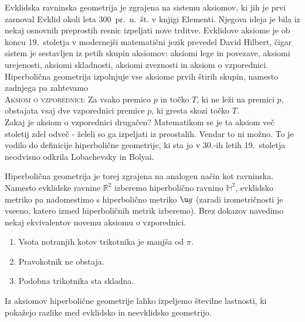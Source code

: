 \documentclass[a4paper]{article}
\begin{document}
Evklidska ravninska geometrija je zgrajena na sistemu aksiomov, ki jih je prvi zasnoval Evklid okoli leta 300~pr.~n.~št. v knjigi Elementi. Njegova ideja je bila iz nekaj osnovnih preprostih resnic izpeljati nove trditve. Evklidove aksiome je ob koncu 19.~stoletja v modernejši matematični jezik prevedel David Hilbert, čigar sistem je sestavljen iz petih skupin aksiomov: aksiomi lege in povezave, aksiomi urejenosti, aksiomi skladnosti, aksiomi zveznosti in aksiom o vzporednici.
Hiperbolična geometrija izpolnjuje vse aksiome prvih štirih skupin, namesto zadnjega pa zahtevamo \\[0.4cm]
\textsc{Aksiom o vzporednici}: Za vsako premico $p$ in točko $T$, ki ne leži na premici $p$, obstajata vsaj dve vzporednici premice $p$, ki gresta skozi točko $T$. \\[0.4cm]
Zakaj je aksiom o vzporednici drugačen? Matematikom se je ta aksiom več stoletij zdel odveč - želeli so ga izpeljati iz preostalih. Vendar to ni možno. To je vodilo do definicije hiperbolične geometrije, ki sta jo v 30.-ih letih 19.~stoletja neodvisno odkrila Lobachevsky in Bolyai.

Hiperbolična geometrija je torej zgrajena na analogen način kot ravninska. Namesto evklidske ravnine $\mathbb{R}^2$ izberemo hiperbolično ravnino $\mathbb{H}^2$, evklidsko metriko pa nadomestimo s hiperbolično metriko $\u g$ (zaradi izometričnosti je vseeno, katero izmed hiperboličnih metrik izberemo).
Brez dokazov navedimo nekaj ekvivalentov novemu aksiomu o vzporednici.
\begin{enumerate}
\item Vsota notranjih kotov trikotnika je manjša od $\pi$.
\item Pravokotnik ne obstaja.
\item Podobna trikotnika sta skladna.
\end{enumerate}
Iz aksiomov hiperbolične geometrije lahko izpeljemo številne lastnosti, ki pokažejo razlike med evklidsko in neevklidsko geometrijo.
\end{document}
